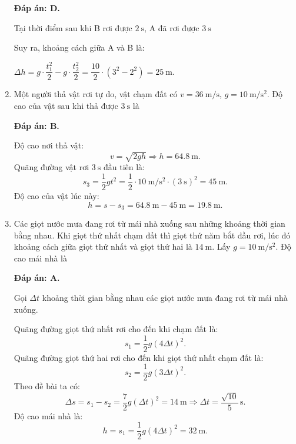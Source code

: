 \begin{enumerate}[label=\bfseries Câu \arabic*:]
{	}
	\hideall
	{	\textbf{Đáp án: D.}
		
		Tại thời điểm sau khi B rơi được $2\ \text{s}$, A đã rơi được $3\ \text{s}$
		
		Suy ra, khoảng cách giữa A và B là:
		
		$\Delta h=g\cdot\dfrac{t_1^2}{2}-g\cdot\dfrac{t_2^2}{2}=\dfrac{10}{2}\cdot \left( 3^2-2^2\right)=25\ \text{m}$.
	}
	\item {}
	
	
	{Một người thả vật rơi tự do, vật chạm đất có $v=\SI{36}{\meter/\second}$, $g=\SI{10}{\meter/\second^2}$. Độ cao của vật sau khi thả được $\SI{3}{\second}$ là
	}
	\hideall
	{	\textbf{Đáp án: B.}
		
		Độ cao nơi thả vật:
		$$v=\sqrt{2gh}\Rightarrow h = \SI{64.8}{\meter}.$$
		Quãng đường vật rơi $\SI{3}{\second}$ đầu tiên là:
		$$s_3=\dfrac{1}{2}gt^2=\dfrac{1}{2}\cdot\SI{10}{\meter/\second^2}\cdot(\SI{3}{\second})^2=\SI{45}{\meter}.$$
		Độ cao của vật lúc này:
		$$h=s-s_3=\SI{64.8}{\meter}-\SI{45}{\meter}=\SI{19.8}{\meter}.$$
	}
	\item {}
	
	
	{Các giọt nước mưa đang rơi từ mái nhà xuống sau những khoảng thời gian bằng nhau. Khi giọt thứ nhất chạm đất thì giọt thứ năm bắt đầu rơi, lúc đó khoảng cách giữa giọt thứ nhất và giọt thứ hai là $\SI{14}{\meter}$. Lấy $g=\SI{10}{\meter/\second^2}$. Độ cao mái nhà là
	}
	\hideall
	{	\textbf{Đáp án: A.}
		
		Gọi $\Delta t$ khoảng thời gian bằng nhau các giọt nước mưa đang rơi từ mái nhà xuống.
		
		Quãng đường giọt thứ nhất rơi cho đến khi chạm đất là:
		$$s_1=\dfrac{1}{2}g(4\Delta t)^2.$$
		Quãng đường giọt thứ hai rơi cho đến khi giọt thứ nhất chạm đất là:
		$$s_2=\dfrac{1}{2}g(3\Delta t)^2.$$
		Theo đề bài ta có:
		$$\Delta s= s_1-s_2=\dfrac{7}{2}g(\Delta t)^2=\SI{14}{\meter}\Rightarrow \Delta t=\dfrac{\sqrt{10}}{5}\,\text{s}.$$
		Độ cao mái nhà là:
		$$h=s_1=\dfrac{1}{2}g(4\Delta t)^2=\SI{32}{\meter}.$$
	}
	

\end{enumerate}
